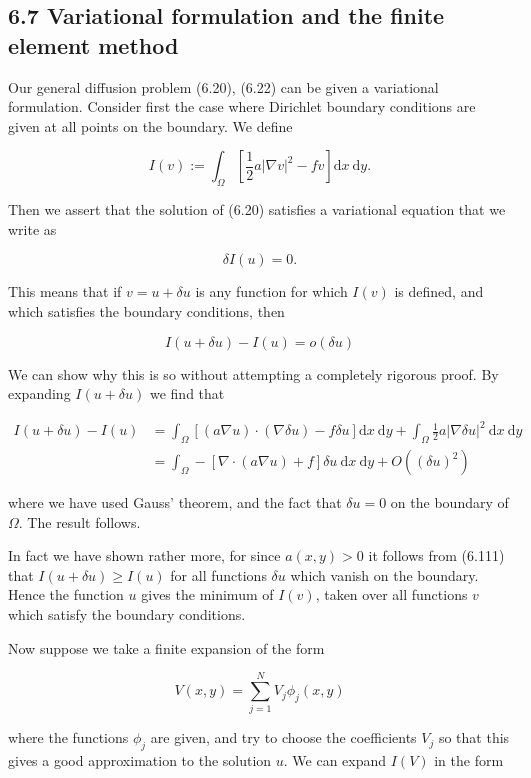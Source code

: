 \documentclass[10pt]{article}
\begin{document}
\subsection*{6.7 Variational formulation and the finite element method}
Our general diffusion problem (6.20), (6.22) can be given a variational formulation. Consider first the case where Dirichlet boundary conditions are given at all points on the boundary. We define

\[
I(v):=\int_{\Omega}\left[\frac{1}{2} a|\nabla v|^{2}-f v\right] \mathrm{d} x \mathrm{~d} y .
\]

Then we assert that the solution of (6.20) satisfies a variational equation that we write as

\[
\delta I(u)=0 .
\]

This means that if \(v=u+\delta u\) is any function for which \(I(v)\) is defined, and which satisfies the boundary conditions, then

\[
I(u+\delta u)-I(u)=o(\delta u)
\]

We can show why this is so without attempting a completely rigorous proof. By expanding \(I(u+\delta u)\) we find that

\[
\begin{aligned}
I(u+\delta u)-I(u) & =\int_{\Omega}[(a \nabla u) \cdot(\nabla \delta u)-f \delta u] \mathrm{d} x \mathrm{~d} y+\int_{\Omega} \frac{1}{2} a|\nabla \delta u|^{2} \mathrm{~d} x \mathrm{~d} y \\
& =\int_{\Omega}-[\nabla \cdot(a \nabla u)+f] \delta u \mathrm{~d} x \mathrm{~d} y+O\left((\delta u)^{2}\right)
\end{aligned}
\]

where we have used Gauss' theorem, and the fact that \(\delta u=0\) on the boundary of \(\Omega\). The result follows.

In fact we have shown rather more, for since \(a(x, y)>0\) it follows from (6.111) that \(I(u+\delta u) \geq I(u)\) for all functions \(\delta u\) which vanish on the boundary. Hence the function \(u\) gives the minimum of \(I(v)\), taken over all functions \(v\) which satisfy the boundary conditions.

Now suppose we take a finite expansion of the form

\[
V(x, y)=\sum_{j=1}^{N} V_{j} \phi_{j}(x, y)
\]

where the functions \(\phi_{j}\) are given, and try to choose the coefficients \(V_{j}\) so that this gives a good approximation to the solution \(u\). We can expand \(I(V)\) in the form
\end{document}
